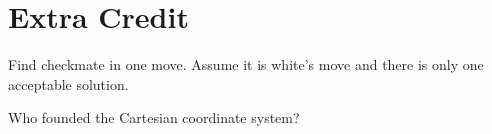 \documentclass[../main.tex]{subfiles}
\begin{document}
\section*{Extra Credit}
    \begin{questions}
    \setcounter{question}{100}
   
    \bonusquestion[10] Find checkmate in one move. Assume it is white's move and there is only one acceptable solution. \newline
    \newgame
    \showboard
    
    \bonusquestion[3] Who founded the Cartesian coordinate system?
    \end{questions}   
\end{document}
